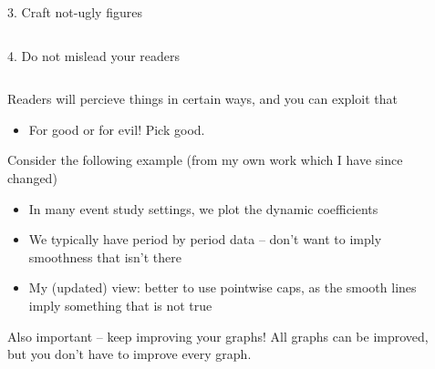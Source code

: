 \documentclass[notes,11pt, aspectratio=169]{beamer}
\newcommand\1{\operatorname{\mathbbm{1}}\indicatorfence}
\newenvironment{wideitemize}{\itemize\addtolength{\itemsep}{10pt}}{\enditemize}
\begin{document}
\begin{frame}{3. Craft not-ugly figures}
\begin{columns}[T]
\begin{column}{.4\textwidth}
  \end{column}
\end{columns}
\end{frame}

\begin{frame}{4. Do not mislead your readers}
  \begin{columns}[T] %
    \begin{column}{.7\textwidth}
      \begin{wideitemize}
      \item Readers will percieve things in certain ways, and you can exploit that
        \begin{itemize}
        \item For good or for evil! Pick good.
        \end{itemize}
      \item Consider the following example (from my own work which I have since changed)
        \begin{itemize}
        \item In many event study settings, we plot the dynamic coefficients
        \item We typically have period by period data -- don't want to
          imply smoothness that isn't there
        \item My (updated) view: better to use pointwise caps, as the
          smooth lines imply something that is not true
        \end{itemize}
      \item Also important -- keep improving your graphs! All graphs
        can be improved, but you don't have to improve every graph.
      \end{wideitemize}
  \end{column}%
  \hfill%
  \begin{column}{.4\textwidth}
  \end{column}
\end{columns}
\end{frame}
\end{document}
